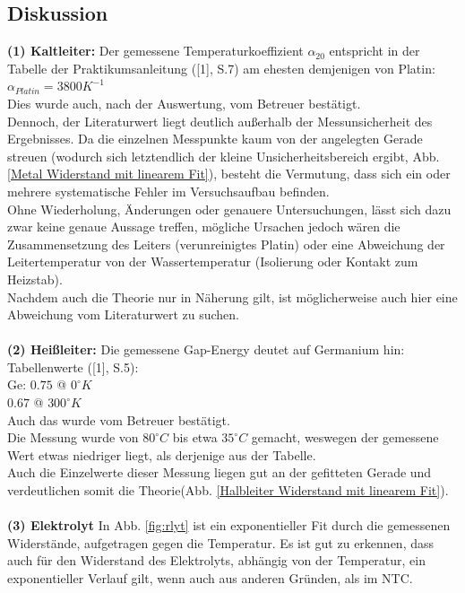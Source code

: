\documentclass[12pt,a4paper]{article}
\begin{document}
\begin{multicols}{2}
\subsection{Diskussion}

\textbf{(1) Kaltleiter:}
Der gemessene Temperaturkoeffizient $\alpha_{20}$ entspricht in der Tabelle der Praktikumsanleitung ([1], S.7) am ehesten demjenigen von Platin:\\
$\alpha_{Platin}= 3800K^{-1}$\\
Dies wurde auch, nach der Auswertung, vom Betreuer bestätigt.\\
Dennoch, der Literaturwert liegt deutlich außerhalb der Messunsicherheit des Ergebnisses. Da die einzelnen Messpunkte kaum von der angelegten Gerade streuen (wodurch sich letztendlich der kleine Unsicherheitsbereich ergibt, Abb. \ref{Metal Widerstand mit linearem Fit}), besteht die Vermutung, dass sich ein oder mehrere systematische Fehler im Versuchsaufbau befinden.\\
Ohne Wiederholung, Änderungen oder genauere Untersuchungen, lässt sich dazu zwar keine genaue Aussage treffen, mögliche Ursachen jedoch wären die Zusammensetzung des Leiters (verunreinigtes Platin) oder eine Abweichung der Leitertemperatur von der Wassertemperatur (Isolierung oder Kontakt zum Heizstab).\\
Nachdem auch die Theorie nur in Näherung gilt, ist möglicherweise auch hier eine Abweichung vom Literaturwert zu suchen.\\
\\
\textbf{(2) Heißleiter:}
Die gemessene Gap-Energy deutet auf Germanium hin:\\
Tabellenwerte ([1], S.5):\\
Ge: $0.75$ @ $0 ^\circ K$\\
$0.67$ @ $300 ^\circ K$\\
Auch das wurde vom Betreuer bestätigt.\\
Die Messung wurde von $80^\circ C$ bis etwa $35^\circ C$ gemacht, weswegen der gemessene Wert etwas niedriger liegt, als derjenige aus der Tabelle.\\
Auch die Einzelwerte dieser Messung liegen gut an der gefitteten Gerade und verdeutlichen somit die Theorie(Abb. \ref{Halbleiter Widerstand mit linearem Fit}).\\
\\
\textbf{(3) Elektrolyt}
In Abb. \ref{fig:rlyt} ist ein exponentieller Fit durch die gemessenen Widerstände, aufgetragen gegen die Temperatur. Es ist gut zu erkennen, dass auch für den Widerstand des Elektrolyts, abhängig von der Temperatur, ein exponentieller Verlauf gilt, wenn auch aus anderen Gründen, als im NTC.\\



\end{multicols}
\end{document}
